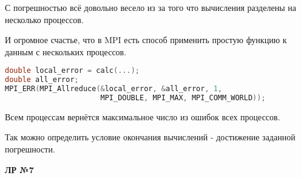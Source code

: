 \documentclass[12pt]{article}
\begin{document}
С погрешностью всё довольно весело из за того что вычисления разделены на несколько процессов.

И огромное счастье, что в MPI есть способ применить простую функцию к данным с нескольких процессов.

\begin{lstlisting}[language=c++]
double local_error = calc(...);
double all_error;
MPI_ERR(MPI_Allreduce(&local_error, &all_error, 1,
                      MPI_DOUBLE, MPI_MAX, MPI_COMM_WORLD));
\end{lstlisting}

Всем процессам вернётся максимальное число из ошибок всех процессов.

Так можно определить условие окончания вычислений - достижение заданной погрешности.



\newpage


\noindent
\textbf{ЛР №7}
\end{document}
